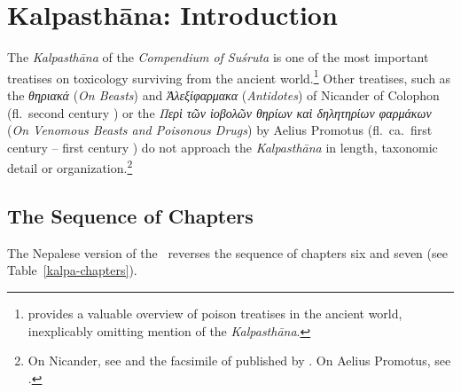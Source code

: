 
\chapter{Kalpasthāna: Introduction}

The \emph{Kalpasthāna} of the \emph{Compendium of Suśruta} is one of
the most important treatises on toxicology surviving from the ancient
world.\footnote{\citet{liu-2021} provides a valuable overview of
    poison treatises in the ancient world, inexplicably omitting mention
    of the \emph{Kalpasthāna}.} Other treatises, such as the
    \emph{\textgreek{θηριακά}} (\emph{On Beasts}) and
    \emph{\textgreek{Ἀλεξίφαρμακα}} (\emph{Antidotes}) of Nicander of
    Colophon (fl.\ second century \BCE) or the \emph{\textgreek{Περὶ τῶν
            ἰοβολῶν θηρίων καὶ δηλητηρίων φαρμάκων}} (\emph{On Venomous 
            Beasts and
        Poisonous Drugs}) by Aelius Promotus (fl.\ ca.\ first century \BCE --
    first century \CE) do not approach the \emph{Kalpasthāna} in length,
    taxonomic detail or organization.\footnote{On Nicander, see
        \cite{gow-1953} and the facsimile of 
        published by \citet{touw-1997}.  On Aelius Promotus, see
        \cites[29]{smit-1870}[363--368]{gost-1897}{ihm-1995}.}


\section{The Sequence of Chapters}
\label{kalpa-chapter-sequence}

The Nepalese version of the \SS\ reverses the sequence of chapters six and 
seven (see 
Table~\ref{kalpa-chapters}).



